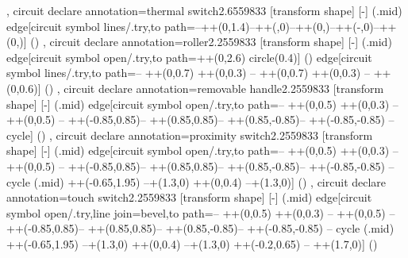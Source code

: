 {{  },
  circuit declare annotation={thermal switch}{2.6559833\tikzcircuitssizeunit}
  {
    [transform shape]
    [-]
    (\tikzlastnode.mid) edge[circuit symbol lines/.try,to path={--++(0,1.4\tikzcircuitssizeunit)--++(\tikzcircuitssizeunit,0)--++(0,\tikzcircuitssizeunit)--++(-\tikzcircuitssizeunit,0)--++(0,\tikzcircuitssizeunit)}] ()
  },
  circuit declare annotation={roller}{2.2559833\tikzcircuitssizeunit}
  {
    [transform shape]
    [-]
    (\tikzlastnode.mid) edge[circuit symbol open/.try,to path={++(0,2.6\tikzcircuitssizeunit) circle(0.4\tikzcircuitssizeunit)}] () edge[circuit symbol lines/.try,to path={-- ++(0,0.7\tikzcircuitssizeunit) ++(0,0.3\tikzcircuitssizeunit) -- ++(0,0.7\tikzcircuitssizeunit) ++(0,0.3\tikzcircuitssizeunit) -- ++(0,0.6\tikzcircuitssizeunit)}] () 
  },
  circuit declare annotation={removable handle}{2.2559833\tikzcircuitssizeunit}
  {
    [transform shape]
    [-]
    (\tikzlastnode.mid) edge[circuit symbol open/.try,to path={-- ++(0,0.5\tikzcircuitssizeunit) ++(0,0.3\tikzcircuitssizeunit) -- ++(0,0.5\tikzcircuitssizeunit) -- ++(-0.85\tikzcircuitssizeunit,0.85\tikzcircuitssizeunit)-- ++(0.85\tikzcircuitssizeunit,0.85\tikzcircuitssizeunit)-- ++(0.85\tikzcircuitssizeunit,-0.85\tikzcircuitssizeunit)-- ++(-0.85\tikzcircuitssizeunit,-0.85\tikzcircuitssizeunit) -- cycle}] ()
  },
  circuit declare annotation={proximity switch}{2.2559833\tikzcircuitssizeunit}
  {
    [transform shape]
    [-]
    (\tikzlastnode.mid) edge[circuit symbol open/.try,to path={-- ++(0,0.5\tikzcircuitssizeunit) ++(0,0.3\tikzcircuitssizeunit) -- ++(0,0.5\tikzcircuitssizeunit) -- ++(-0.85\tikzcircuitssizeunit,0.85\tikzcircuitssizeunit)-- ++(0.85\tikzcircuitssizeunit,0.85\tikzcircuitssizeunit)-- ++(0.85\tikzcircuitssizeunit,-0.85\tikzcircuitssizeunit)-- ++(-0.85\tikzcircuitssizeunit,-0.85\tikzcircuitssizeunit) -- cycle (\tikzlastnode.mid) ++(-0.65\tikzcircuitssizeunit,1.95\tikzcircuitssizeunit) --+(1.3\tikzcircuitssizeunit,0) ++(0,0.4\tikzcircuitssizeunit) --+(1.3\tikzcircuitssizeunit,0)}] ()
  },
  circuit declare annotation={touch switch}{2.2559833\tikzcircuitssizeunit}
  {
    [transform shape]
    [-]
    (\tikzlastnode.mid) edge[circuit symbol open/.try,line join=bevel,to path={-- ++(0,0.5\tikzcircuitssizeunit) ++(0,0.3\tikzcircuitssizeunit) -- ++(0,0.5\tikzcircuitssizeunit) -- ++(-0.85\tikzcircuitssizeunit,0.85\tikzcircuitssizeunit)-- ++(0.85\tikzcircuitssizeunit,0.85\tikzcircuitssizeunit)-- ++(0.85\tikzcircuitssizeunit,-0.85\tikzcircuitssizeunit)-- ++(-0.85\tikzcircuitssizeunit,-0.85\tikzcircuitssizeunit) -- cycle (\tikzlastnode.mid) ++(-0.65\tikzcircuitssizeunit,1.95\tikzcircuitssizeunit) --+(1.3\tikzcircuitssizeunit,0) ++(0,0.4\tikzcircuitssizeunit) --+(1.3\tikzcircuitssizeunit,0) ++(-0.2\tikzcircuitssizeunit,0.65\tikzcircuitssizeunit) -- ++(1.7\tikzcircuitssizeunit,0)}] ()
}}

